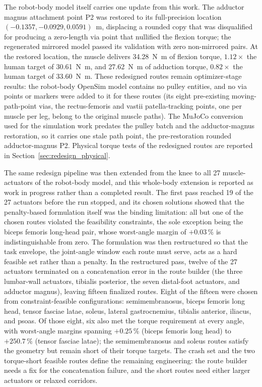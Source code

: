 The robot-body model itself carries one update from this work. The adductor magnus attachment point P2 was restored to its full-precision location $(-0.1357, -0.0929, 0.0591)$~m, displacing a rounded copy that was disqualified for producing a zero-length via point that nullified the flexion torque; the regenerated mirrored model passed its validation with zero non-mirrored pairs. At the restored location, the muscle delivers \qty{34.28}{\newton\meter} of flexion torque, $1.12\times$ the human target of \qty{30.61}{\newton\meter}, and \qty{27.62}{\newton\meter} of adduction torque, $0.82\times$ the human target of \qty{33.60}{\newton\meter}. These redesigned routes remain optimizer-stage results: the robot-body OpenSim model contains no pulley entities, and no via points or markers were added to it for these routes (its eight pre-existing moving-path-point vias, the rectus-femoris and vastii patella-tracking points, one per muscle per leg, belong to the original muscle paths). The MuJoCo conversion used for the simulation work predates the pulley batch and the adductor-magnus restoration, so it carries one stale path point, the pre-restoration rounded adductor-magnus P2. Physical torque tests of the redesigned routes are reported in Section~\ref{sec:redesign_physical}.

The same redesign pipeline was then extended from the knee to all 27 muscle-actuators of the robot-body model, and this whole-body extension is reported as work in progress rather than a completed result. The first pass reached 19 of the 27 actuators before the run stopped, and its chosen solutions showed that the penalty-based formulation itself was the binding limitation: all but one of the chosen routes violated the feasibility constraints, the sole exception being the biceps femoris long-head pair, whose worst-angle margin of $+0.03\,\%$ is indistinguishable from zero. The formulation was then restructured so that the task envelope, the joint-angle window each route must serve, acts as a hard feasible set rather than a penalty. In the restructured pass, twelve of the 27 actuators terminated on a concatenation error in the route builder (the three lumbar-wall actuators, tibialis posterior, the seven distal-foot actuators, and adductor magnus), leaving fifteen finalized routes. Eight of the fifteen were chosen from constraint-feasible configurations: semimembranosus, biceps femoris long head, tensor fasciae latae, soleus, lateral gastrocnemius, tibialis anterior, iliacus, and psoas. Of those eight, six also met the torque requirement at every angle, with worst-angle margins spanning $+0.25\,\%$ (biceps femoris long head) to $+250.7\,\%$ (tensor fasciae latae); the semimembranosus and soleus routes satisfy the geometry but remain short of their torque targets. The crash set and the two torque-short feasible routes define the remaining engineering: the route builder needs a fix for the concatenation failure, and the short routes need either larger actuators or relaxed corridors.

